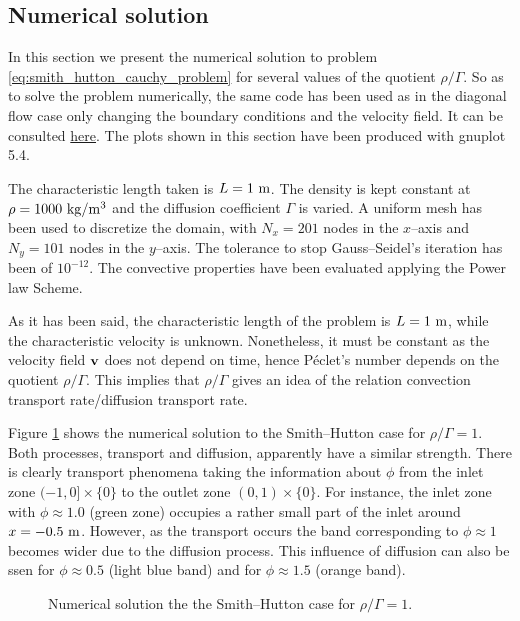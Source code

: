 
\subsection{Numerical solution}

In this section we present the numerical solution to problem
\eqref{eq:smith_hutton_cauchy_problem} for several values of the quotient $\rho
/ \Gamma$. So as to solve the problem numerically, the same \CC code has been
used as in the diagonal flow case only changing the boundary conditions and the
velocity field. It can be consulted
\href{https://github.com/plosan/convection_diffusion_equations}{here}.
The plots shown in this section have been produced with gnuplot 5.4. 

The characteristic length taken is $L = 1 \ \meter$. The density is
kept constant at $\rho = 1000 \ \kilo\gram / \meter^3$ and the diffusion
coefficient $\Gamma$ is varied. A uniform mesh has been used to discretize the
domain, with $N_x = 201$ nodes in the $x$--axis and $N_y = 101$ nodes in the
$y$--axis. The tolerance to stop Gauss--Seidel's iteration has been of
$10^{-12}$. The convective properties have been evaluated applying the
Power law Scheme. 

As it has been said, the characteristic length of the problem is $L = 1 \
\meter$, while the characteristic velocity is unknown. Nonetheless, it must be
constant as the velocity field $\vb{v}$ does not depend on time, hence Péclet's
number depends on the quotient $\rho / \Gamma$. This implies that $\rho /
\Gamma$ gives an idea of the relation convection transport rate/diffusion
transport rate.

Figure \ref{fig:smith_hutton_N201_Pe1.0e+00} shows the numerical solution to the
Smith--Hutton case for $\rho / \Gamma = 1$. Both processes, transport and
diffusion, apparently have a similar strength. There is clearly transport
phenomena taking the information about $\phi$ from the inlet zone $(-1, 0]
\times \{ 0 \}$ to the outlet zone $(0,1) \times \{ 0 \}$. For instance, the
inlet zone with $\phi \approx 1.0$ (green zone) occupies a rather small part of
the inlet around $x = -0.5 \ \meter$. However, as the transport occurs the band
corresponding to $\phi \approx 1$ becomes wider due to the diffusion process.
This influence of diffusion can also be ssen for $\phi \approx 0.5$ (light blue
band) and for $\phi \approx 1.5$ (orange band).

\begin{figure}[ht]
	\centering
	
	\caption{Numerical solution the the Smith--Hutton case for $\rho / \Gamma = 1$.}
	\label{fig:smith_hutton_N201_Pe1.0e+00}
\end{figure}

